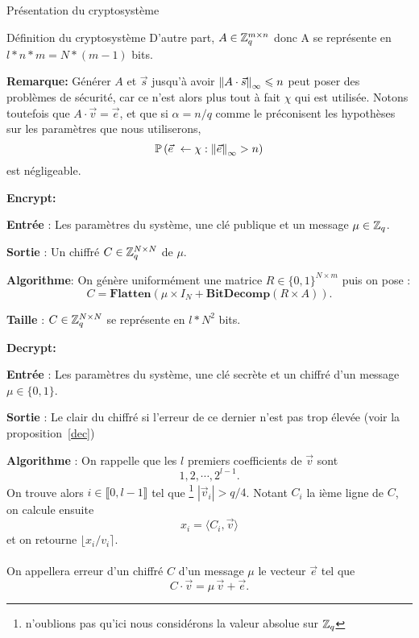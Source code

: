 \begin{section}{Présentation du cryptosystème}
\begin{subsection}{Définition du cryptosystème}
	D'autre part, $A \in \mathbb{Z}_q^{m \times n}$ donc A se représente en $l * n * m =	N * (m - 1)$ bits.

	\textbf{Remarque:} Générer $A$ et $\vec{s}$ jusqu'à avoir ${\|A \cdot \vec{s}\|}_{\infty} \leqslant n$ peut poser des problèmes de sécurité, car ce n'est alors plus tout à fait $\chi$ qui est utilisée. Notons toutefois que $A \cdot \vec{v} = \vec{e}$, et que si $\alpha = n/q$ comme le préconisent les hypothèses sur les paramètres que nous utiliserons,
	\[ \PP\left(\vec{e} \leftarrow \chi: \norm{\vec{e}} > n\right) \]
	est négligeable.

\vspace{0.5cm}\noindent\textbf{Encrypt:}
\flushleft
	
	\textbf{Entrée} : Les paramètres du système, une clé publique et un message $\mu \in \mathbb{Z}_q$.

	\textbf{Sortie} : Un chiffré $C \in \mathbb{Z}_q^{N \times N}$ de $\mu$.

	\textbf{Algorithme}: On génère uniformément une matrice $R \in \{ 0,1\} ^{N \times m}$ puis on pose :
	\[C = \textbf{Flatten}(\mu \times I_N + \textbf{BitDecomp}(R \times A)).\]

	\textbf{Taille} : $C \in \mathbb{Z}_q^{N \times N}$ se représente en $l * N^2$ bits.
	
\vspace{0.5cm}\noindent\textbf{Decrypt:}
\flushleft
	
	\textbf{Entrée} : Les paramètres du système, une clé secrète et un chiffré d'un message $\mu \in \{ 0,1\}$.

	\textbf{Sortie} : Le clair du chiffré si l'erreur de ce dernier n'est pas trop élevée (voir la proposition~\ref{dec})

	\textbf{Algorithme} : On rappelle que les $l$ premiers coefficients de $\vec{v}$ sont 
	\[1, 2, \cdots, 2^{l-1}.\]
	On trouve alors $i\in\llbracket 0, l-1\rrbracket$ tel que
	\footnote{n'oublions pas qu'ici nous considérons la valeur absolue sur $\mathbb{Z}_q$} 
	$|\vec{v}_i| > q/4$. Notant $C_i$ la ième ligne de $C$, on calcule ensuite 
	\[ x_i = \langle C_i, \vec{v} \rangle \] et on retourne $\lfloor x_i/v_i \rceil$.


\paragraph{}
\begin{definition}
On appellera erreur d'un chiffré $C$ d'un message $\mu$ le vecteur $\vec{e}$ tel que
\[ C\cdot \vec{v} = \mu\, \vec{v} + \vec{e}. \]
\end{definition}


\end{subsection}
\end{section}
